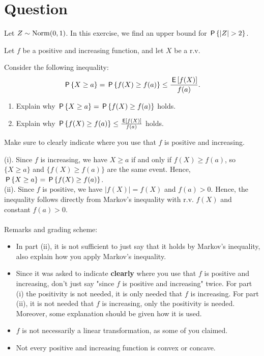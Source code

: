\section*{Question}

Let $Z \sim \Norm{0,1}$. 
In this exercise, we find an upper bound for $\P{|Z| > 2}$.

\begin{exercise}[1.5]
 Let $f$ be a positive and increasing function, and let $X$ be a r.v. 

Consider the following inequality:
$$\P{X \geq a} = \P{f(X) \geq f(a)}   \leq \frac{\E{f(X)}}{f(a)}.$$
\begin{enumerate}
\item[(i)] Explain why $\P{X \geq a} = \P{f(X) \geq f(a)}$ holds. 
\item[(ii)] Explain why $\P{f(X) \geq f(a)}   \leq \frac{\E{f(X)}}{f(a)}$ holds. 
\end{enumerate}
Make sure to clearly indicate where you use that  $f$ is positive and increasing. \\
\begin{solution}
(i). Since $f$ is increasing, we have $X \geq a$ if and only if $f(X) \geq f(a)$, so $\{X \geq a\}$ and $\{f(X) \geq f(a)\}$ are the same event. Hence,  $\P{X \geq a} = \P{f(X) \geq f(a)}$.  \\
(ii). Since $f$ is positive, we have $|f(X)| = f(X)$ and $f(a) > 0$. Hence, the inequality follows directly from Markov's inequality with r.v. $f(X)$ and constant $f(a) > 0$. \\ \\ 
\noindent Remarks and grading scheme:
\begin{itemize}
\item In part (ii), it is not sufficient to just say that it holds by Markov's inequality, also explain how you apply Markov's inequality. 
\item Since it was asked to indicate \textbf{clearly} where you use that  $f$ is positive and increasing, don't just say "since $f$ is positive and increasing" twice. For part (i) the positivity is not needed, it is only needed that $f$ is increasing. For part (ii), it is not needed that $f$ is increasing, only the positivity is needed. Moreover, some explanation should be given how it is used.
\item $f$ is not necessarily a linear transformation, as some of you claimed.
\item Not every positive and increasing function is convex or concave. \\ 

\end{itemize}
\end{solution}
\end{exercise}
